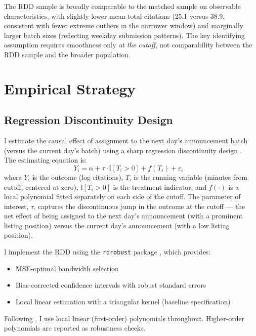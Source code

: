 \documentclass[12pt]{article}
\newcommand{\ind}{\mathbb{I}}
\begin{document}
The RDD sample is broadly comparable to the matched sample on observable characteristics, with slightly lower mean total citations (25.1 versus 38.9, consistent with fewer extreme outliers in the narrower window) and marginally larger batch sizes (reflecting weekday submission patterns). The key identifying assumption requires smoothness only \textit{at the cutoff}, not comparability between the RDD sample and the broader population.




\section{Empirical Strategy}

\subsection{Regression Discontinuity Design}

I estimate the causal effect of assignment to the next day's announcement batch (versus the current day's batch) using a sharp regression discontinuity design \citep{lee2010, cattaneo2020}. The estimating equation is:
\begin{equation}
Y_i = \alpha + \tau \cdot \ind[T_i > 0] + f(T_i) + \varepsilon_i
\label{eq:rdd}
\end{equation}
where $Y_i$ is the outcome (log citations), $T_i$ is the running variable (minutes from cutoff, centered at zero), $\ind[T_i > 0]$ is the treatment indicator, and $f(\cdot)$ is a local polynomial fitted separately on each side of the cutoff. The parameter of interest, $\tau$, captures the discontinuous jump in the outcome at the cutoff --- the net effect of being assigned to the next day's announcement (with a prominent listing position) versus the current day's announcement (with a low listing position).

I implement the RDD using the \texttt{rdrobust} package \citep{calonico2014, calonico2020}, which provides:
\begin{itemize}
\item MSE-optimal bandwidth selection \citep{imbens2012}
\item Bias-corrected confidence intervals with robust standard errors
\item Local linear estimation with a triangular kernel (baseline specification)
\end{itemize}

Following \citet{gelman2019}, I use local linear (first-order) polynomials throughout. Higher-order polynomials are reported as robustness checks.
\end{document}
